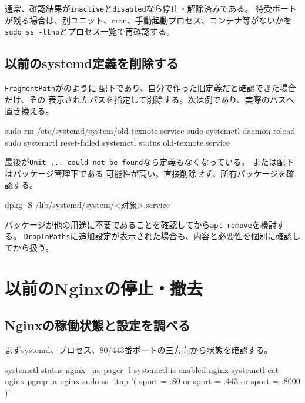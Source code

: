 \documentclass[uplatex,a4paper,11pt]{jsarticle}
\begin{document}
通常、確認結果が\texttt{inactive}と\texttt{disabled}なら停止・解除済みである。
待受ポートが残る場合は、別ユニット、cron、手動起動プロセス、コンテナ等がないかを
\texttt{sudo ss -ltnp}とプロセス一覧で再確認する。

\subsection{以前のsystemd定義を削除する}

\texttt{FragmentPath}がのように
配下であり、自分で作った旧定義だと確認できた場合だけ、その
表示されたパスを指定して削除する。次は例であり、実際のパスへ置き換える。

\begin{command}
sudo rm /etc/systemd/system/old-texnote.service
sudo systemctl daemon-reload
sudo systemctl reset-failed
systemctl status old-texnote.service
\end{command}

最後が\texttt{Unit ... could not be found}なら定義もなくなっている。
または配下はパッケージ管理下である
可能性が高い。直接削除せず、所有パッケージを確認する。

\begin{command}
dpkg -S /lib/systemd/system/<対象>.service
\end{command}

パッケージが他の用途に不要であることを確認してから\texttt{apt remove}を検討する。
\texttt{DropInPaths}に追加設定が表示された場合も、内容と必要性を個別に確認してから扱う。

\section{以前のNginxの停止・撤去}

\subsection{Nginxの稼働状態と設定を調べる}

まずsystemd、プロセス、80/443番ポートの三方向から状態を確認する。

\begin{command}
systemctl status nginx --no-pager -l
systemctl is-enabled nginx
systemctl cat nginx
pgrep -a nginx
sudo ss -ltnp '( sport = :80 or sport = :443 or sport = :8000 )'
\end{command}
\end{document}
